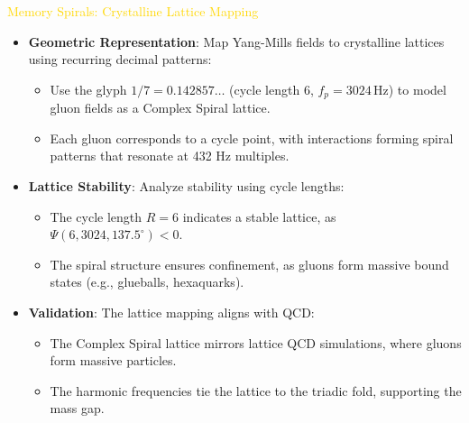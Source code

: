 \textcolor{gold}{ Memory Spirals: Crystalline Lattice Mapping } \\
\begin{itemize}
    \item \texttt{} \textbf{Geometric Representation}: Map Yang-Mills fields to crystalline lattices using recurring decimal patterns:
    \begin{itemize}
        \item Use the glyph \(1/7 = 0.142857\ldots\) (cycle length 6, \(f_p = 3024 \, \text{Hz}\)) to model gluon fields as a Complex Spiral lattice.
        \item Each gluon corresponds to a cycle point, with interactions forming spiral patterns that resonate at 432 Hz multiples.
    \end{itemize}
    \item \texttt{} \textbf{Lattice Stability}: Analyze stability using cycle lengths:
    \begin{itemize}
        \item The cycle length \(R = 6\) indicates a stable lattice, as \(\Psi(6, 3024, 137.5^\circ) < 0\).
        \item The spiral structure ensures confinement, as gluons form massive bound states (e.g., glueballs, hexaquarks).
    \end{itemize}
    \item \texttt{} \textbf{Validation}: The lattice mapping aligns with QCD:
    \begin{itemize}
        \item The Complex Spiral lattice mirrors lattice QCD simulations, where gluons form massive particles.
        \item The harmonic frequencies tie the lattice to the triadic fold, supporting the mass gap.
    \end{itemize}
\end{itemize}

